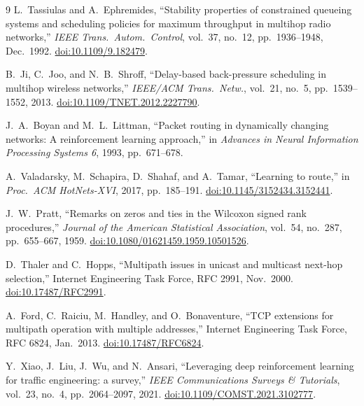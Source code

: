\documentclass[11pt]{article}
\begin{document}




\begin{thebibliography}{9}
L.~Tassiulas and A.~Ephremides, ``Stability properties of constrained
queueing systems and scheduling policies for maximum throughput in
multihop radio networks,'' \emph{IEEE Trans.\ Autom.\ Control},
vol.~37, no.~12, pp.~1936--1948, Dec.~1992. \href{https://doi.org/10.1109/9.182479}{doi:10.1109/9.182479}.

B.~Ji, C.~Joo, and N.~B.~Shroff, ``Delay-based back-pressure
scheduling in multihop wireless networks,''
\emph{IEEE/ACM Trans.\ Netw.}, vol.~21, no.~5,
pp.~1539--1552, 2013. \href{https://doi.org/10.1109/TNET.2012.2227790}{doi:10.1109/TNET.2012.2227790}.

J.~A.~Boyan and M.~L.~Littman, ``Packet routing in dynamically
changing networks: A reinforcement learning approach,''
in \emph{Advances in Neural Information Processing Systems 6}, 1993, pp.~671--678.

A.~Valadarsky, M.~Schapira, D.~Shahaf, and A.~Tamar, ``Learning to
route,'' in \emph{Proc.\ ACM HotNets-XVI}, 2017, pp.~185--191. \href{https://doi.org/10.1145/3152434.3152441}{doi:10.1145/3152434.3152441}.

J.~W.~Pratt, ``Remarks on zeros and ties in the Wilcoxon signed
rank procedures,'' \emph{Journal of the American Statistical
Association}, vol.~54, no.~287, pp.~655--667, 1959. \href{https://doi.org/10.1080/01621459.1959.10501526}{doi:10.1080/01621459.1959.10501526}.

D.~Thaler and C.~Hopps, ``Multipath issues in unicast and
multicast next-hop selection,'' Internet Engineering Task Force, RFC 2991, Nov.~2000. \href{https://doi.org/10.17487/RFC2991}{doi:10.17487/RFC2991}.

A.~Ford, C.~Raiciu, M.~Handley, and O.~Bonaventure, ``TCP extensions
for multipath operation with multiple addresses,'' Internet Engineering Task Force, RFC 6824, Jan.~2013. \href{https://doi.org/10.17487/RFC6824}{doi:10.17487/RFC6824}.

Y.~Xiao, J.~Liu, J.~Wu, and N.~Ansari, ``Leveraging deep reinforcement
learning for traffic engineering: a survey,'' \emph{IEEE
Communications Surveys \& Tutorials}, vol.~23, no.~4,
pp.~2064--2097, 2021. \href{https://doi.org/10.1109/COMST.2021.3102777}{doi:10.1109/COMST.2021.3102777}.


\end{thebibliography}
\end{document}
